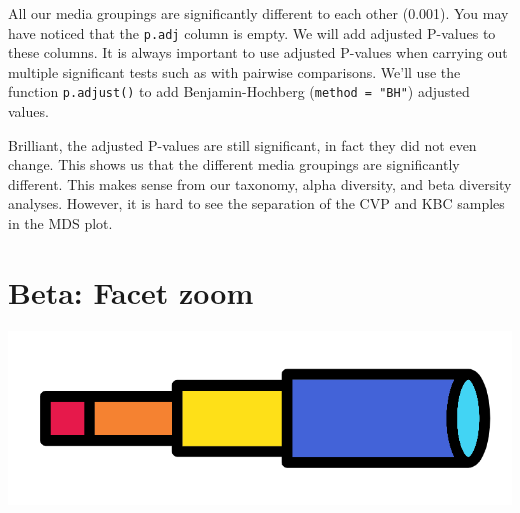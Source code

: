 \documentclass[
]{book}
\newenvironment{Shaded}{\begin{snugshade}}{\end{snugshade}}
\newcommand{\AttributeTok}[1]{\textcolor[rgb]{0.13,0.29,0.53}{#1}}
\newcommand{\CommentTok}[1]{\textcolor[rgb]{0.56,0.35,0.01}{\textit{#1}}}
\newcommand{\ConstantTok}[1]{\textcolor[rgb]{0.56,0.35,0.01}{#1}}
\newcommand{\FunctionTok}[1]{\textcolor[rgb]{0.13,0.29,0.53}{\textbf{#1}}}
\newcommand{\NormalTok}[1]{#1}
\newcommand{\OtherTok}[1]{\textcolor[rgb]{0.56,0.35,0.01}{#1}}
\newcommand{\SpecialCharTok}[1]{\textcolor[rgb]{0.81,0.36,0.00}{\textbf{#1}}}
\newcommand{\StringTok}[1]{\textcolor[rgb]{0.31,0.60,0.02}{#1}}
\begin{document}
All our media groupings are significantly different to each other (0.001).
You may have noticed that the \texttt{p.adj} column is empty.
We will add adjusted P-values to these columns.
It is always important to use adjusted P-values when carrying out multiple significant tests such as with pairwise comparisons.
We'll use the function \texttt{p.adjust()} to add Benjamin-Hochberg (\texttt{method\ =\ "BH"}) adjusted values.

\begin{Shaded}
\end{Shaded}

Brilliant, the adjusted P-values are still significant, in fact they did not even change.
This shows us that the different media groupings are significantly different.
This makes sense from our taxonomy, alpha diversity, and beta diversity analyses.
However, it is hard to see the separation of the CVP and KBC samples in the MDS plot.

\hypertarget{beta-facet-zoom}{%
\section{Beta: Facet zoom}\label{beta-facet-zoom}}

\includegraphics{figures/telescope.png}
\end{document}
